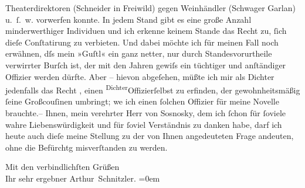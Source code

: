                Theaterdirektoren (Schneider
               in Freiwild) gegen Weinhändler (Schwager Garlan) u. ſ. w. vorwerfen konnte. In jedem Stand
              gibt es {\pb}eine große Anzahl minderwerthiger Individuen und ich erkenne keinem Stande
               das Recht zu,{ }ſich dieſe Conſtatirung zu verbieten. Und dabei möchte ich für meinen
               Fall noch erwähnen, dſs mein »Guſtl« ein ganz
               netter, nur durch Standesvorurtheile verwirrter Burſch ist, der mit den Jahren gewiſs
               ein tüchtiger und anſtändiger Offizier werden dürfte. Aber – hievon abgeſehen, müßte
               ich mir als Dichter jedenfalls das Recht {\pb}\label{K_L04234-2v}\label{K_L04234-2}, einen \substVorne{}\textsuperscript{Dichter}\substDazwischen{}Offizier\substHinten{}{ }\introOben{}ſelbst\introOben{} zu erfinden, der gewohnheitsmäßig{ }ſeine Großcouſinen umbringt; we{\geminationn}
               ich einen{ }ſolchen Offizier für meine Novelle brauchte.– Ihnen, mein verehrter Herr
               von Sosnosky, dem ich{ }ſchon für{ }ſoviele wahre Liebenswürdigkeit und für{ }ſoviel
               Verständnis zu danken habe, darf ich heute auch dieſe meine Stellung zu der von Ihnen
               angedeuteten Frage andeuten, ohne die Befürchtg misverſtanden zu werden.\pend
           
\pstart
           Mit den verbindlichſten Grüßen {\\[\baselineskip]}Ihr sehr ergebner \spacefill\mbox{Arthur
                  Schnitzler.}\pend
           \leftskip=0em{}\endnumbering{}
\begin{anhang}
\end{anhang}\newcommand{\dateiname}{L04234}\newcommand{\titel}{Arthur Schnitzler an Theodor von Sosnosky, 26. 5. 1901}\newcommand{\editorInnen}{Herausgegeben von Jahnke, SelmaMüller, Martin Anton}
